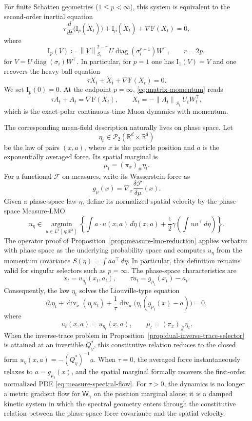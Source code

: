 \documentclass{article}
\newcommand{\R}{\mathbb{R}}
\newcommand{\cP}{\mathcal{P}}
\newcommand{\mF}{\mathrm{F}}
\newcommand{\mI}{\mathrm{I}}
\newcommand{\MF}{\mathcal{F}}
\newcommand{\Wg}{\mathsf{W}_{\gamma}}
\newcommand{\diag}{\operatorname{diag}}
\newcommand{\norm}[1]{\left\lVert #1 \right\rVert}
\begin{document}
For finite Schatten geometries ($1\le p<\infty$), this system is equivalent
to the second-order inertial equation
$$
\tau \frac{d}{dt}\bigl(\mI_p(\dot X_t)\bigr) + \mI_p(\dot X_t) + \nabla \mF(X_t)=0,
$$
where
$$
\mI_p(V)
\coloneqq
\norm{V}_{S_r}^{2-r}\,U\diag(\sigma_i^{r-1})W^\top,
\qquad r=2p,
$$
for $V=U\diag(\sigma_i)W^\top$. In particular, for $p=1$ one has $\mI_1(V)=V$ and one recovers the heavy-ball equation
$$
\tau \ddot X_t + \dot X_t + \nabla \mF(X_t)=0.
$$
We set $\mI_p(0)=0$.
At the endpoint $p=\infty$, \eqref{eq:matrix-momentum} reads
$$
\tau \dot A_t + A_t = \nabla \mF(X_t),
\qquad
\dot X_t = -\norm{A_t}_{S_1}\,U_tW_t^\top,
$$
which is the exact-polar continuous-time Muon dynamics with momentum.

The corresponding mean-field description naturally lives on phase space. Let
$$
\eta_t\in\cP_2(\R^d\times\R^d)
$$
be the law of pairs $(x,a)$, where $x$ is the particle position and $a$ is the exponentially averaged force. Its spatial marginal is
$$
\mu_t=(\pi_x)_\#\eta_t.
$$
For a functional $\MF$ on measures, write its Wasserstein force as
$$
g_\mu(x)=\nabla_x\frac{\delta\MF}{\delta\mu}(x).
$$
Given a phase-space law $\eta$, define its normalized spatial velocity by the
phase-space Measure-LMO
\[
 u_\eta\in\operatorname*{argmin}_{u\in L^2(\eta;\R^d)}
 \left\{
   \int a\cdot u(x,a)\,d\eta(x,a)
   +\frac12\gamma\!\left(\int uu^\top\,d\eta\right)
 \right\}.
\]
The operator proof of Proposition~\ref{prop:measure-lmo-reduction} applies
verbatim with phase space as the underlying probability space and computes
$u_\eta$ from the momentum covariance
$S(\eta)=\int aa^\top\,d\eta$. In particular, this definition remains valid
for singular selectors such as $p=\infty$. The phase-space characteristics
are
\begin{equation}
\label{eq:phase-momentum-characteristics}
\dot x_t=u_{\eta_t}(x_t,a_t),
\qquad
\tau\dot a_t=g_{\mu_t}(x_t)-a_t .
\end{equation}
Consequently, the law $\eta_t$ solves the Liouville-type equation
\begin{equation}
\label{eq:phase-momentum-liouville}
\partial_t\eta_t
+\operatorname{div}_x(\eta_t u_t)
+\frac1\tau\operatorname{div}_a\!\bigl(\eta_t(g_{\mu_t}(x)-a)\bigr)=0,
\end{equation}
where
$$
u_t(x,a)=u_{\eta_t}(x,a),
\qquad
\mu_t=(\pi_x)_\#\eta_t.
$$
When the inverse-trace problem in
Proposition~\ref{prop:dual-inverse-trace-selector} is attained at an
invertible $Q_\eta^*$, this constitutive relation reduces to the closed form
$u_\eta(x,a)=-(Q_\eta^*)^{-1}a$.
When $\tau=0$, the averaged force instantaneously relaxes to $a=g_{\mu_t}(x)$, and the spatial marginal formally recovers the first-order normalized PDE \eqref{eq:measure-spectral-flow}. For $\tau>0$, the dynamics is no longer a metric gradient flow for $\Wg$ on the position marginal alone; it is a damped kinetic system in which the spectral geometry enters through the constitutive relation between the phase-space force covariance and the spatial velocity.
\end{document}
